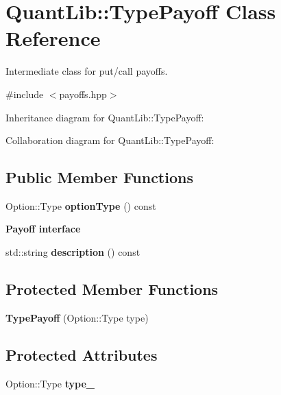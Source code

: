 \section{Quant\+Lib\+:\+:Type\+Payoff Class Reference}
\label{class_quant_lib_1_1_type_payoff}


Intermediate class for put/call payoffs.  




{\ttfamily \#include $<$payoffs.\+hpp$>$}



Inheritance diagram for Quant\+Lib\+:\+:Type\+Payoff\+:


Collaboration diagram for Quant\+Lib\+:\+:Type\+Payoff\+:
\subsection*{Public Member Functions}
\begin{DoxyCompactItemize}
\item 
Option\+::\+Type {\bfseries option\+Type} () const \label{class_quant_lib_1_1_type_payoff_a67f16112fcf220108102d04924751593}

\end{DoxyCompactItemize}
\begin{Indent}{\bf Payoff interface}\par
\begin{DoxyCompactItemize}
\item 
std\+::string {\bfseries description} () const \label{class_quant_lib_1_1_type_payoff_ab313b06585c3205f3b0a749458cae2a8}

\end{DoxyCompactItemize}
\end{Indent}
\subsection*{Protected Member Functions}
\begin{DoxyCompactItemize}
\item 
{\bfseries Type\+Payoff} (Option\+::\+Type type)\label{class_quant_lib_1_1_type_payoff_ad79b48279b590d246a611009bca455c1}

\end{DoxyCompactItemize}
\subsection*{Protected Attributes}
\begin{DoxyCompactItemize}
\item 
Option\+::\+Type {\bfseries type\+\_\+}\label{class_quant_lib_1_1_type_payoff_af4e5a4d11b0c069fcde370573be46191}

\end{DoxyCompactItemize}


